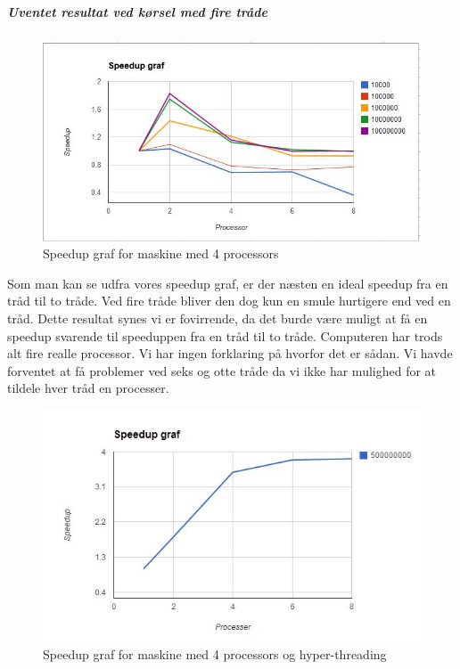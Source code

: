 \subparagraph{Uventet resultat ved kørsel med fire tråde}

\begin{figure}[h!]
\centering
\includegraphics{Images/oo2-1-2-FrederikSpeedUp}
\caption{Speedup graf for maskine med 4 processors}
\label{FrederikSpeed}
\end{figure}

Som man kan se udfra vores speedup graf, er der næsten en ideal speedup fra en tråd til to tråde. Ved fire tråde bliver den dog kun en smule hurtigere end ved en tråd. Dette resultat synes vi er fovirrende, da det burde være muligt at få en speedup svarende til speeduppen fra en tråd til to tråde. Computeren har trods alt fire realle processor. Vi har ingen forklaring på hvorfor det er sådan. 
Vi havde forventet at få problemer ved seks og otte tråde da vi ikke har mulighed for at tildele hver tråd en processer. 

\begin{figure}[h!]
\centering
\includegraphics{Images/oo2-1-2-MelnykSpeedUp}
\caption{Speedup graf for maskine med 4 processors og hyper-threading}
\label{MelnykSpeed}
\end{figure}

